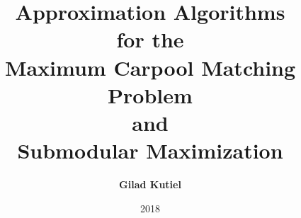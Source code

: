 \title{
Approximation Algorithms 
\\
for the
\\
Maximum Carpool Matching Problem
\\
and 
\\
Submodular Maximization
}
\author[shortname]{
    \textbf{Gilad Kutiel}
}
\date{2018}

